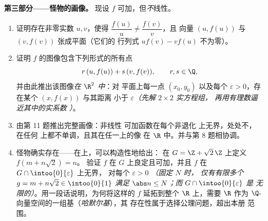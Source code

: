 \begin{problem}[{周末问题——$f(x + y) = f(x) + f(y)$：
正则性导出线性，以及“怪物”的画像}]
\medskip
\noindent\textbf{第三部分——怪物的画像。}
现设 $f$ 可加，但\emph{不}线性。
\begin{enumerate}[resume]
  \item 证明存在非零实数 $u, v$，使得
        $\dfrac{f(u)}{u} \neq \dfrac{f(v)}{v}$，且
        向量 $(u, f(u))$ 与 $(v, f(v))$ 张成平面（它们的
        行列式 $u f(v) - v f(u)$ 不为零）。
  \item 证明 $f$ 的图像包含下列形式的所有点
        \[
        r\,(u, f(u)) + s\,(v, f(v)), \qquad r, s \in \Q ,
        \]
        并由此推出该图像\emph{在 $\R^2$ 中}：对
        平面上每一点 $(x_0, y_0)$ 以及每个
        $\varepsilon > 0$，存在某个 $(x, f(x))$ 与其距离
        小于 $\varepsilon$\emph{（先解 $2\times2$ 实方程组，
        再用有理数逼近其中的实系数
        ）}。
  \item 由第 11 题推出完整画像：非线性
        可加函数在每个非退化
        上无界，处处不，在任何
        上都不单调，且其在任一上的像
        在 $\R$ 中。并与第 8 题相协调。
  \item 怪物确实存在——在上，可以构造性地给出：
        在 $G = \Z + \sqrt2\,\Z$ 上定义 $f(m + n\sqrt2) = n$。
        验证 $f$ 在 $G$ 上良定且可加，并且
        $f$ 在 $G \cap \intoo{0}{\varepsilon}$ 上无界，
        对每个 $\varepsilon > 0$ \emph{（固定 $N$ 时，
        仅有有限多个 $g = m + n\sqrt2 \in \intoo{0}{1}$ 满足
        $\abs n \leq N$；而 $G \cap \intoo{0}{\varepsilon}$ 是
        无限的）}。用一段话说明，为何将这样的
        $f$ 延拓到整个 $\R$ 上，需要 $\R$ 作为
        $\Q$-向量空间的一组基（\emph{哈默尔基}），其
        存在性属于选择公理问题，超出本册
        范围。
\end{enumerate}


\end{problem}
